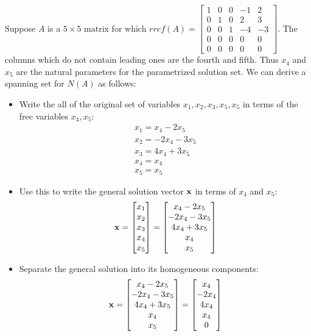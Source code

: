 \documentclass{ximera}
\begin{document}
\begin{example}
Suppose $A$ is a $5\times 5$ matrix for which $rref(A) = 
\begin{bmatrix} 1 & 0 & 0 & -1 & 2\\0 & 1 & 0 & 2 & 3\\0 & 0 & 1 & -4 & -3\\
0 & 0 & 0 & 0 & 0\\0 & 0 & 0 & 0 & 0\end{bmatrix}$. The columns which do not contain leading ones are the fourth and fifth. Thus $x_4$ and $x_5$ are the natural parameters for the parametrized solution set. We can derive a spanning set for $N(A)$ as follows:
\begin{itemize}
\item Write the all of the original set of variables $x_1, x_2, x_3, x_5, x_5$ in terms of the free variables $x_4, x_5$:
\begin{gather*}
x_1 = x_4 - 2x_5\\
x_2 = -2x_4 - 3x_5\\
x_3 = 4x_4 + 3x_5\\
x_4 = x_4\\
x_5 = x_5
\end{gather*}
\item Use this to write the general solution vector $\bf x$ in terms of $x_4$ and $x_5$:
\[
{\bf x} = \begin{bmatrix}x_1\\x_2\\x_3\\x_4\\x_5\end{bmatrix} =
\begin{bmatrix}x_4 - 2x_5\\-2x_4 -3x_5\\4x_4 + 3x_5\\x_4\\x_5\end{bmatrix}
\]
\item Separate the general solution into its homogeneous components:
\[
{\bf x} = \begin{bmatrix}x_4 - 2x_5\\-2x_4 -3x_5\\4x_4 + 3x_5\\x_4\\x_5\end{bmatrix}
= \begin{bmatrix}x_4\\-2x_4\\4x_4\\x_4\\0\end{bmatrix}
\]
\end{itemize}
\end{example}
\end{document}
